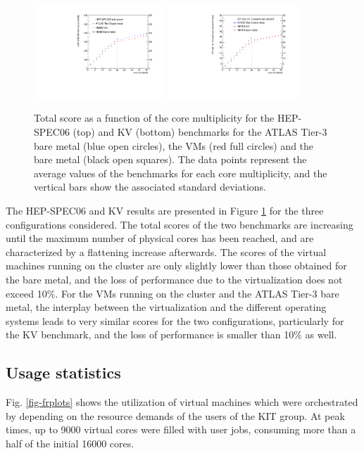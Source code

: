 \begin{figure}[htbp]
\centering
\includegraphics[width=0.44\textwidth]{benchmark-hepspec06-total.pdf}
\includegraphics[width=0.44\textwidth]{kv-BFG-BM-NEMO-VM-NEMO-BM-total.pdf} 
\caption{Total score as a function of the core multiplicity for the HEP-SPEC06 (top) and KV (bottom) benchmarks for the ATLAS Tier-3 bare metal (blue open circles),
the \NEMO VMs (red full circles) and the \NEMO bare metal (black open squares). The data points represent the average values of the benchmarks for each core multiplicity,
and the vertical bars show the associated standard deviations.}
\label{bmk-total}
\end{figure}

The HEP-SPEC06 and KV results are presented in Figure \ref{bmk-total} for the three configurations considered.
The total scores of the two benchmarks are increasing until the maximum number of physical cores has been reached, and are characterized by a flattening increase afterwards.
The scores of the virtual machines running on the \NEMO cluster are only slightly lower than those obtained for the \NEMO bare metal, and the loss of performance
due to the virtualization does not exceed 10$\%$.
For the VMs running on the \NEMO cluster and the ATLAS Tier-3 bare metal, the interplay between the virtualization and the different operating systems leads to very similar scores
for the two configurations, particularly for the KV benchmark, and the loss of performance is smaller than 10$\%$ as well.



\subsection{Usage statistics}
Fig. \ref{fig-frplots} shows the utilization of virtual machines which were orchestrated by \Roced depending on the resource demands of the users of the KIT group.
At peak times, up to 9000 virtual cores were filled with user jobs, consuming more than a half of the initial 16000 \NEMO cores.


